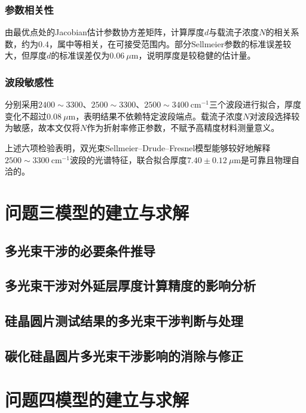 \documentclass[12pt,a4paper]{ctexart}
\begin{document}
	\subsubsection{参数相关性}
	由最优点处的Jacobian估计参数协方差矩阵，计算厚度$d$与载流子浓度$N$的相关系数，约为$0.4$，属中等相关，在可接受范围内。部分Sellmeier参数的标准误差较大，但厚度$d$的标准误差仅为$0.06\ \mu\mathrm{m}$，说明厚度是较稳健的估计量。
	
	\subsubsection{波段敏感性}
	分别采用$2400\sim3300$、$2500\sim3300$、$2500\sim3400\ \mathrm{cm^{-1}}$三个波段进行拟合，厚度变化不超过$0.08\ \mu\mathrm{m}$，表明结果不依赖特定波段端点。载流子浓度$N$对波段选择较为敏感，故本文仅将$N$作为折射率修正参数，不赋予高精度材料测量意义。
	
	上述六项检验表明，双光束Sellmeier–Drude–Fresnel模型能够较好地解释$2500\sim3300\ \mathrm{cm^{-1}}$波段的光谱特征，联合拟合厚度$7.40\pm0.12\ \mu\mathrm{m}$是可靠且物理自洽的。
	
	\section{问题三模型的建立与求解}
	
	\subsection{多光束干涉的必要条件推导}
	
	\subsection{多光束干涉对外延层厚度计算精度的影响分析}
	
	\subsection{硅晶圆片测试结果的多光束干涉判断与处理}
	
	\subsection{碳化硅晶圆片多光束干涉影响的消除与修正}
	
	\section{问题四模型的建立与求解}
	
\end{document}

